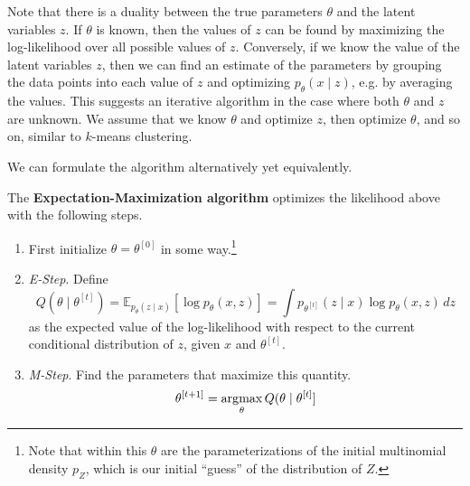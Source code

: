   Note that there is a duality between the true parameters $\theta$ and the latent variables $z$. If $\theta$ is known, then the values of $z$ can be found by maximizing the log-likelihood over all possible values of $z$. Conversely, if we know the value of the latent variables $z$, then we can find an estimate of the parameters by grouping the data points into each value of $z$ and optimizing $p_\theta (x \mid z)$, e.g. by averaging the values. This suggests an iterative algorithm in the case where both $\theta$ and $z$ are unknown. We assume that we know $\theta$ and optimize $z$, then optimize $\theta$, and so on, similar to $k$-means clustering. 

  We can formulate the algorithm alternatively yet equivalently.  

  \begin{algo}[EM Algorithm]
    The \textbf{Expectation-Maximization algorithm} optimizes the likelihood above with the following steps. 
    \begin{enumerate}
      \item First initialize $\theta = \theta^{[0]}$ in some way.\footnote{Note that within this $\theta$ are the parameterizations of the initial multinomial density $p_Z$, which is our initial ``guess'' of the distribution of $Z$.}

      \item \textit{E-Step}. Define 
      \begin{equation}
        Q(\theta \mid \theta^{[t]}) = \mathbb{E}_{p_\theta (z \mid x)}[ \log p_\theta(x, z) ] = \int p_{\theta^{[t]}} (z \mid x) \log{p_\theta (x, z)} \,dz
      \end{equation}
      as the expected value of the log-likelihood with respect to the current conditional distribution of $z$, given $x$ and $\theta^{[t]}$. 

      \item \textit{M-Step}. Find the parameters that maximize this quantity. 
      \begin{equation}
        \theta^{[t+1]} = \argmax_\theta Q(\theta \mid \theta^{[t]}]
      \end{equation}
    \end{enumerate}
  \end{algo}

